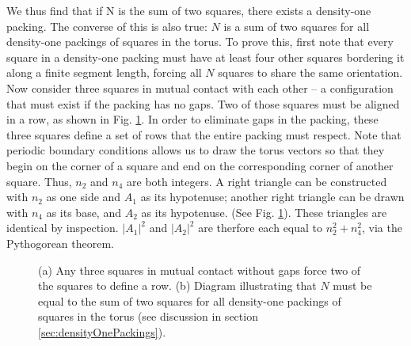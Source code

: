 \documentclass{umthesis}          %
\begin{document}
We thus find that if N is the sum of two squares, there exists a density-one packing. The converse of this is also true: $N$ is a sum of two squares for all density-one packings of squares in the torus. To prove this, first note that every square in a density-one packing must have at least four other squares bordering it along a finite segment length, forcing all $N$ squares to share the same orientation.  Now consider three squares in mutual contact with each other -- a configuration that must exist if the packing has no gaps. Two of those squares must be aligned in a row, as shown in Fig. \ref{fig:aligned}. In order to eliminate gaps in the packing, these three squares define a set of rows that the entire packing must respect. Note that periodic boundary conditions allows us to draw the torus vectors so that they begin on the corner of a square and end on the corresponding corner of another square.  Thus, $n_2$ and $n_4$ are both integers. A right triangle can be constructed with $n_2$ as one side and $A_1$ as its hypotenuse; another right triangle can be drawn with $n_4$ as its base, and $A_2$ as its hypotenuse. (See Fig. \ref{fig:aligned}). These triangles are identical by inspection.  $|A_1|^2$ and $|A_2|^2$ are therfore each equal to $n_2^2 + n_4^2$, via the Pythogorean theorem.

\begin{figure}[H]
\caption{\label{fig:aligned} (a) Any three squares in mutual contact without gaps force two of the squares to define a row. (b) Diagram illustrating that $N$ must be equal to the sum of two squares for all density-one packings of squares in the torus (see discussion in section \ref{sec:densityOnePackings}).}
\end{figure} 
\end{document}
